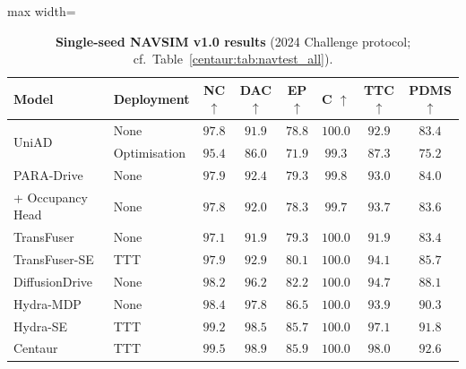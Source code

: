 \begin{table}[t]
  \centering
  \caption[Single-seed NAVSIM v1.0 results]{\textbf{Single-seed NAVSIM v1.0 results} (2024 Challenge protocol; cf.\ Table~\ref{centaur:tab:navtest_all}).}
  \label{centaur:tab:navtest_all_supp}
  \begin{adjustbox}{max width=\textwidth}
  \begin{tabular}{ll|cccc|cc}
    \toprule
    \textbf{Model} & \textbf{Deployment} & \textbf{NC} $\uparrow$ & \textbf{DAC} $\uparrow$ & \textbf{EP} $\uparrow$ & \textbf{C} $\uparrow$ & \textbf{TTC} $\uparrow$ & \textbf{PDMS} $\uparrow$ \\
    \midrule
    \multirow{2}{*}{UniAD~\cite{hu2023uniad}} & None & $97.8$ & $91.9$ & $78.8$ & $100.0$ & $92.9$ & $83.4$ \\
    & Optimisation & $95.4$ & $86.0$ & $71.9$ & $99.3$ & $87.3$ & $75.2$ \\
    \midrule
    PARA-Drive~\cite{weng2024paradrive} & None & $97.9$ & $92.4$ & $79.3$ & $99.8$ & $93.0$ & $84.0$ \\
    + Occupancy Head & None & $97.8$ & $92.0$ & $78.3$ & $99.7$ & $93.7$ & $83.6$ \\
    \midrule
    TransFuser~\cite{chitta2023transfuser} & None & $97.1$ & $91.9$ & $79.3$ & $100.0$ & $91.9$ & $83.4$ \\
    TransFuser-SE & TTT & $97.9$ & $92.9$ & $80.1$ & $100.0$ & $94.1$ & $85.7$ \\
    \midrule
    DiffusionDrive~\cite{liao2025diffusiondrive} & None & $98.2$ & $96.2$ & $82.2$ & $100.0$ & $94.7$ & $88.1$ \\
    \midrule
    Hydra-MDP~\cite{li2024hydramdp} & None & $98.4$ & $97.8$ & $86.5$ & $100.0$ & $93.9$ & $90.3$ \\
    Hydra-SE & TTT & $99.2$ & $98.5$ & $85.7$ & $100.0$ & $97.1$ & $91.8$ \\
    Centaur & TTT & $99.5$ & $98.9$ & $85.9$ & $100.0$ & $98.0$ & $92.6$ \\
    \bottomrule
  \end{tabular}
  \end{adjustbox}
\end{table}

